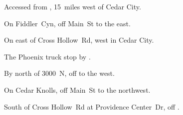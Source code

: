 
\begin{LocationList}

Accessed from , 15~miles west of Cedar City.

On Fiddler~Cyn, off  Main~St to the east.

On  east of Cross Hollow~Rd, west in Cedar City.

The Phoenix truck stop by  .

By  north of 3000~N, off   to the west.

On Cedar Knolls, off  Main~St to the northwest.

South of Cross Hollow~Rd at Providence Center~Dr, off  .

\end{LocationList}
